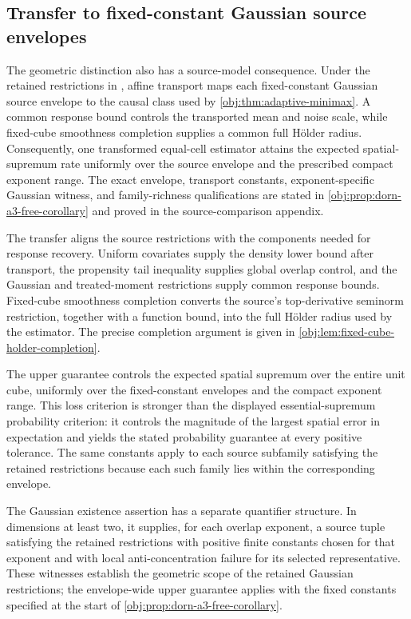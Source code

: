 \subsection{Transfer to fixed-constant Gaussian source envelopes}

The geometric distinction also has a source-model consequence. Under the retained restrictions in \citet[Section 2, Assumptions 1--2, pp.~3--7]{Dorn2026GlobalOverlap}, affine transport maps each fixed-constant Gaussian source envelope to the causal class used by \cref{obj:thm:adaptive-minimax}. A common response bound controls the transported mean and noise scale, while fixed-cube smoothness completion supplies a common full Hölder radius. Consequently, one transformed equal-cell estimator attains the expected spatial-supremum rate uniformly over the source envelope and the prescribed compact exponent range. The exact envelope, transport constants, exponent-specific Gaussian witness, and family-richness qualifications are stated in \cref{obj:prop:dorn-a3-free-corollary} and proved in the source-comparison appendix.



The transfer aligns the source restrictions with the components needed for response recovery. Uniform covariates supply the density lower bound after transport, the propensity tail inequality supplies global overlap control, and the Gaussian and treated-moment restrictions supply common response bounds. Fixed-cube smoothness completion converts the source's top-derivative seminorm restriction, together with a function bound, into the full Hölder radius used by the estimator. The precise completion argument is given in \cref{obj:lem:fixed-cube-holder-completion}.

The upper guarantee controls the expected spatial supremum over the entire unit cube, uniformly over the fixed-constant envelopes and the compact exponent range. This loss criterion is stronger than the displayed essential-supremum probability criterion: it controls the magnitude of the largest spatial error in expectation and yields the stated probability guarantee at every positive tolerance. The same constants apply to each source subfamily satisfying the retained restrictions because each such family lies within the corresponding envelope.

The Gaussian existence assertion has a separate quantifier structure. In dimensions at least two, it supplies, for each overlap exponent, a source tuple satisfying the retained restrictions with positive finite constants chosen for that exponent and with local anti-concentration failure for its selected representative. These witnesses establish the geometric scope of the retained Gaussian restrictions; the envelope-wide upper guarantee applies with the fixed constants specified at the start of \cref{obj:prop:dorn-a3-free-corollary}.

